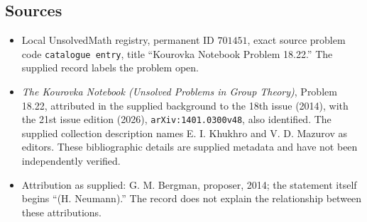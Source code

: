 \documentclass[11pt]{article}
\begin{document}
\subsection{Sources}
\begin{itemize}
\item Local UnsolvedMath registry, permanent ID \(701451\), exact source problem code \texttt{catalogue entry}, title ``Kourovka Notebook Problem 18.22.'' The supplied record labels the problem open.
\item \emph{The Kourovka Notebook (Unsolved Problems in Group Theory)}, Problem 18.22, attributed in the supplied background to the 18th issue (2014), with the 21st issue edition (2026), \texttt{arXiv:1401.0300v48}, also identified. The supplied collection description names E. I. Khukhro and V. D. Mazurov as editors. These bibliographic details are supplied metadata and have not been independently verified.
\item Attribution as supplied: G. M. Bergman, proposer, 2014; the statement itself begins ``(H. Neumann).'' The record does not explain the relationship between these attributions.
\end{itemize}
\end{document}
